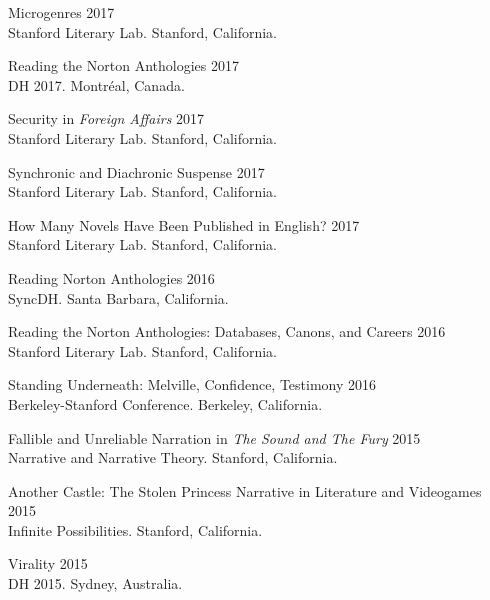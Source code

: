 \documentclass[
  12pt,
  letterpaper,
]{article}
\begin{document}
Microgenres \hfill 2017\\
\hspace*{0.333em} Stanford Literary Lab. Stanford, California.

Reading the Norton Anthologies \hfill 2017\\
\hspace*{0.333em} DH 2017. Montréal, Canada.

Security in \emph{Foreign Affairs} \hfill 2017\\
\hspace*{0.333em} Stanford Literary Lab. Stanford, California.

Synchronic and Diachronic Suspense \hfill 2017\\
\hspace*{0.333em} Stanford Literary Lab. Stanford, California.

How Many Novels Have Been Published in English? \hfill 2017\\
\hspace*{0.333em} Stanford Literary Lab. Stanford, California.

Reading Norton Anthologies \hfill 2016\\
\hspace*{0.333em} SyncDH. Santa Barbara, California.

Reading the Norton Anthologies: Databases, Canons, and Careers
\hfill 2016\\
\hspace*{0.333em} Stanford Literary Lab. Stanford, California.

Standing Underneath: Melville, Confidence, Testimony \hfill 2016\\
\hspace*{0.333em} Berkeley-Stanford Conference. Berkeley, California.

Fallible and Unreliable Narration in \emph{The Sound and The Fury}
\hfill 2015\\
\hspace*{0.333em} Narrative and Narrative Theory. Stanford, California.

Another Castle: The Stolen Princess Narrative in Literature and
Videogames \hfill 2015\\
\hspace*{0.333em} Infinite Possibilities. Stanford, California.

Virality \hfill 2015\\
\hspace*{0.333em} DH 2015. Sydney, Australia.
\end{document}
